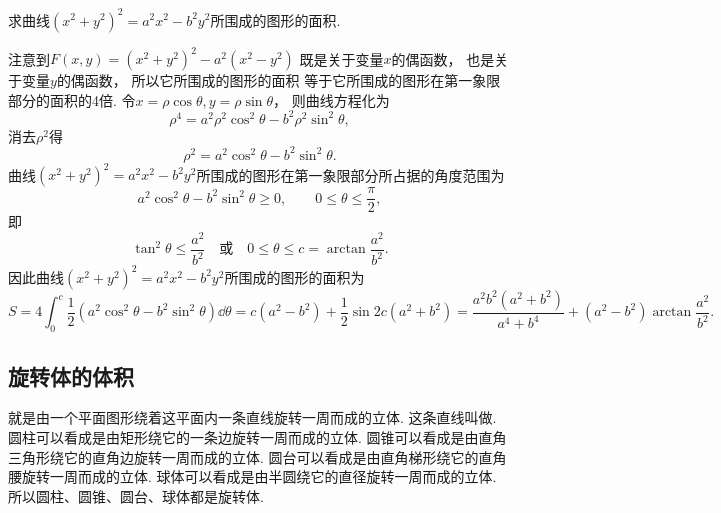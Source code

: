 \begin{example}
求曲线\((x^2+y^2)^2 = a^2 x^2 - b^2 y^2\)所围成的图形的面积.
\begin{solution}
注意到\(F(x,y) = (x^2+y^2)^2 - a^2(x^2-y^2)\)
既是关于变量\(x\)的偶函数，
也是关于变量\(y\)的偶函数，
所以它所围成的图形的面积
等于它所围成的图形在第一象限部分的面积的4倍.
令\(x = \rho \cos\theta,
y = \rho \sin\theta\)，
则曲线方程化为\begin{equation*}
	\rho^4 = a^2 \rho^2 \cos^2\theta - b^2 \rho^2 \sin^2\theta,
\end{equation*}
消去\(\rho^2\)得\begin{equation*}
	\rho^2 = a^2 \cos^2\theta - b^2 \sin^2\theta.
\end{equation*}
曲线\((x^2+y^2)^2 = a^2 x^2 - b^2 y^2\)所围成的图形在第一象限部分所占据的角度范围为\begin{equation*}
	a^2 \cos^2\theta - b^2 \sin^2\theta \geq 0,
	\qquad
	0 \leq \theta \leq \frac\pi2,
\end{equation*}
即\begin{equation*}
	\tan^2\theta \leq \frac{a^2}{b^2}
	\quad\text{或}\quad
	0 \leq \theta \leq c = \arctan\frac{a^2}{b^2}.
\end{equation*}
因此曲线\((x^2+y^2)^2 = a^2 x^2 - b^2 y^2\)所围成的图形的面积为\begin{equation*}
	S = 4 \int_0^c \frac12 (a^2 \cos^2\theta - b^2 \sin^2\theta) \dd\theta
	= c (a^2 - b^2) + \frac12 \sin2c (a^2 + b^2)
	= \frac{a^2 b^2 (a^2 + b^2)}{a^4 + b^4} + (a^2 - b^2) \arctan\frac{a^2}{b^2}.
\end{equation*}
\end{solution}
\end{example}

\subsection{旋转体的体积}
就是由一个平面图形绕着这平面内一条直线旋转一周而成的立体.
这条直线叫做.
圆柱可以看成是由矩形绕它的一条边旋转一周而成的立体.
圆锥可以看成是由直角三角形绕它的直角边旋转一周而成的立体.
圆台可以看成是由直角梯形绕它的直角腰旋转一周而成的立体.
球体可以看成是由半圆绕它的直径旋转一周而成的立体.
所以圆柱、圆锥、圆台、球体都是旋转体.

